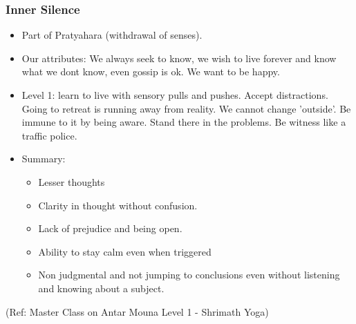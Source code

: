 \begin{frame}[fragile]\frametitle{Inner Silence}


		\begin{itemize}
		\item Part of Pratyahara (withdrawal of senses).
		\item Our attributes: We always seek to know, we wish to live forever and know what we dont know, even gossip is ok. We want to be happy.
		\item Level 1: learn to live with sensory pulls and pushes. Accept distractions. Going to retreat is running away from reality. We cannot change 'outside'. Be immune to it by being aware. Stand there in the problems. Be witness like a traffic police.
		\item Summary:
			\begin{itemize}
			\item Lesser thoughts
			\item Clarity in thought without confusion.
			\item Lack of prejudice and being open.
			\item Ability to stay calm even when triggered 
			\item Non judgmental and not jumping to conclusions even without listening and knowing about a subject.
			\end{itemize}
		\end{itemize}

  


{\tiny (Ref:  Master Class on Antar Mouna Level 1 - Shrimath Yoga)}

\end{frame}




